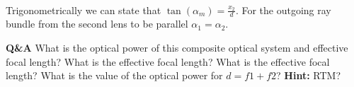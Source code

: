 \documentclass[main.tex]{subfiles}
\begin{document}
\\ Trigonometrically we can state that $\tan(\alpha_m) = \frac{x_2}{d}$. For the outgoing ray bundle from the second lens to be parallel $\alpha_1 = \alpha_2$.\\











\newpage

\textbf{Q\&A} What is the optical power of this composite optical system and effective focal length? What is the effective focal length? What is the effective focal length? What is the value of the optical power for $d=f1+f2$? \textbf{Hint:} RTM?\\
\end{document}
